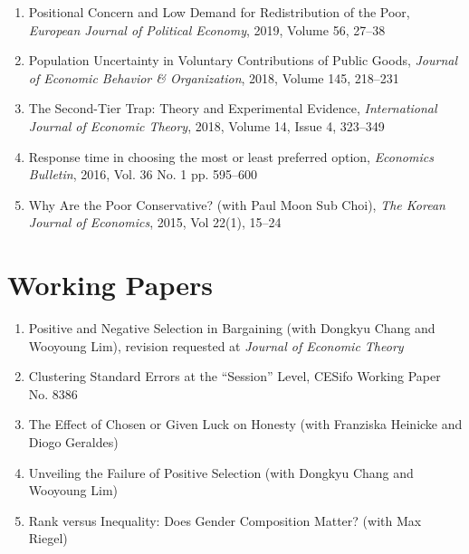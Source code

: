 \documentclass[margin, a4paper]{res}
\begin{document}
\begin{resume}
\begin{enumerate}[leftmargin=*]
\item Positional Concern and Low Demand for Redistribution of the Poor, \emph{European Journal of Political Economy}, 2019, Volume 56, 27--38
\item Population Uncertainty in Voluntary Contributions of Public Goods, \emph{Journal of Economic Behavior \& Organization}, 2018, Volume 145, 218--231
\item The Second-Tier Trap: Theory and Experimental Evidence, \emph{International Journal of Economic Theory}, 2018, Volume 14, Issue 4, 323--349
\item Response time in choosing the most or least preferred option, \textit{Economics Bulletin}, 2016, Vol. 36 No. 1 pp. 595--600
\item Why Are the Poor Conservative? (with Paul Moon Sub Choi), \textit{The Korean Journal of Economics}, 2015, Vol 22(1), 15--24
\end{enumerate}

\section{Working Papers}
\begin{enumerate}[leftmargin=*]
\item Positive and Negative Selection in Bargaining (with Dongkyu Chang and Wooyoung Lim), revision requested at \emph{Journal of Economic Theory}
\item Clustering Standard Errors at the ``Session'' Level, CESifo Working Paper No. 8386
\item The Effect of Chosen or Given Luck on Honesty (with Franziska Heinicke and Diogo Geraldes)
\item Unveiling the Failure of Positive Selection (with Dongkyu Chang and Wooyoung Lim)
\item Rank versus Inequality: Does Gender Composition Matter? (with Max Riegel)

\end{enumerate}



\end{resume}
\end{document}
